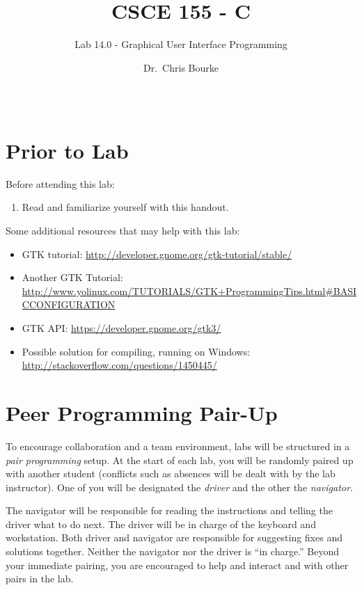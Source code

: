 \documentclass[12pt]{scrartcl}
\title{CSCE 155 - C}
\subtitle{Lab 14.0 - Graphical User Interface Programming}
\author{Dr.\ Chris Bourke}
\date{~}
\begin{document}
\maketitle

\section*{Prior to Lab}

Before attending this lab:
\begin{enumerate}
  \item Read and familiarize yourself with this handout.
\end{enumerate}

Some additional resources that may help with this lab:
\begin{itemize}
  \item GTK tutorial: \url{http://developer.gnome.org/gtk-tutorial/stable/}
  \item Another GTK Tutorial: \\
  \url{http://www.yolinux.com/TUTORIALS/GTK+ProgrammingTips.html#BASICCONFIGURATION}
  \item GTK API: \url{https://developer.gnome.org/gtk3/}
  \item Possible solution for compiling, running on Windows: \\
  \url{http://stackoverflow.com/questions/1450445/}
\end{itemize}

\section*{Peer Programming Pair-Up}

To encourage collaboration and a team environment, labs will be
structured in a \emph{pair programming} setup.  At the start of
each lab, you will be randomly paired up with another student 
(conflicts such as absences will be dealt with by the lab instructor).
One of you will be designated the \emph{driver} and the other
the \emph{navigator}.  

The navigator will be responsible for reading the instructions and
telling the driver what to do next.  The driver will be in charge of the
keyboard and workstation.  Both driver and navigator are responsible
for suggesting fixes and solutions together.  Neither the navigator
nor the driver is ``in charge.''  Beyond your immediate pairing, you
are encouraged to help and interact and with other pairs in the lab.
\end{document}
